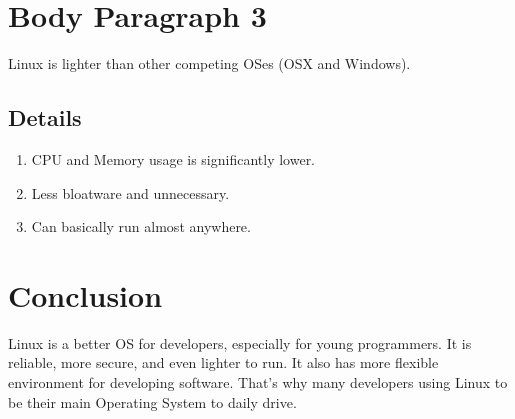 \documentclass[a4paper, 10pt]{article}
\begin{document}
    \section*{Body Paragraph 3}
        Linux is lighter than other competing OSes (OSX and Windows).
        \subsection*{Details}
        \begin{enumerate}
            \item CPU and Memory usage is significantly lower.
            \item Less bloatware and unnecessary.
            \item Can basically run almost anywhere.
        \end{enumerate}

    \section*{Conclusion}
        Linux is a better OS for developers, especially for young programmers. It is reliable,
        more secure, and even lighter to run. It also has more flexible environment for developing software.
        That's why many developers using Linux to be their main Operating System to daily drive.
\end{document}
